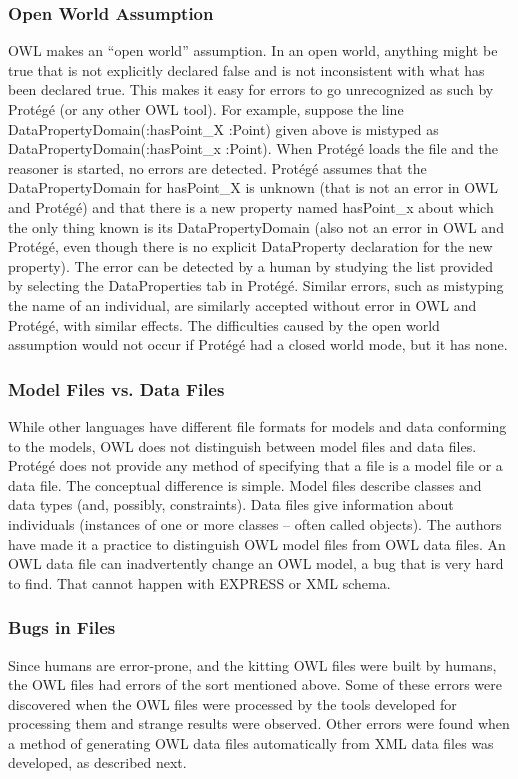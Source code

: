 \subsubsection{Open World Assumption}
OWL makes an ``open world'' assumption.  In an open world, anything might
be true that is not explicitly declared false and is not inconsistent with
what has been declared true. This makes it easy for errors to go
unrecognized as such by  Prot\'{e}g\'{e} (or any other OWL tool). For example,
suppose the line \sf DataPropertyDomain(:hasPoint\_X :Point) \rm given
above is mistyped as \sf DataPropertyDomain(:hasPoint\_x :Point)\rm. When
 Prot\'{e}g\'{e} loads the file and the reasoner is started, no errors are
detected.  Prot\'{e}g\'{e} assumes that the DataPropertyDomain for \sf hasPoint\_X
\rm is unknown (that is not an error in OWL and  Prot\'{e}g\'{e}) and that there is a new
property named \sf hasPoint\_x \rm about which the only thing known is its
DataPropertyDomain (also not an error in OWL and  Prot\'{e}g\'{e}, even though there is no
explicit DataProperty declaration for the new property). The error can be
detected by a human by studying the list provided by selecting the
DataProperties tab in  Prot\'{e}g\'{e}. Similar errors, such as mistyping the name of an individual, are
similarly accepted without error in OWL and  Prot\'{e}g\'{e}, with similar effects.
The difficulties caused by the open world assumption would not occur if
 Prot\'{e}g\'{e} had a closed world mode, but it has none.

\subsubsection{Model Files vs. Data Files}
While other languages have different file formats for models and
data conforming to the models, OWL does not distinguish between model files
and data files.  Prot\'{e}g\'{e} does not provide any method of specifying that a
file is a model file or a data file. The conceptual difference is simple.
Model files describe classes and data types (and, possibly,
constraints). Data files give information about individuals (instances of
one or more classes -- often called objects). The authors have made it a
practice to distinguish OWL model files from OWL data files. An OWL data
file can inadvertently change an OWL model, a bug that is very hard to
find. That cannot happen with EXPRESS or XML schema.

\subsubsection{Bugs in Files}
Since humans are error-prone, and the kitting OWL files were built by
humans, the OWL files had errors of the sort mentioned above. Some of these
errors were discovered when the OWL files were processed by the tools
developed for processing them and strange results were observed. Other
errors were found when a method of generating OWL data files automatically
from XML data files was developed, as described next.

